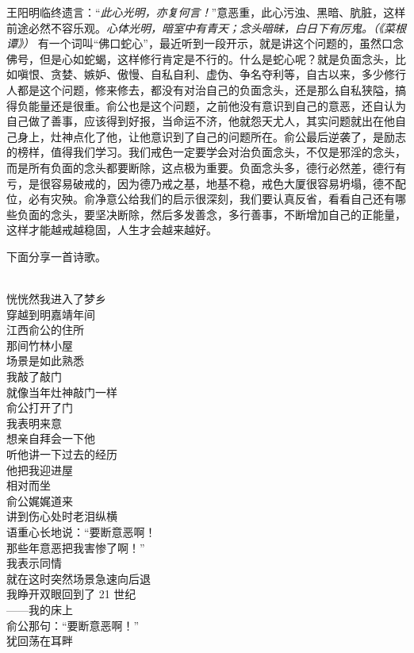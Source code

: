 王阳明临终遗言：“\textit{此心光明，亦复何言！}”意恶重，此心污浊、黑暗、肮脏，这样前途必然不容乐观。\textit{心体光明，暗室中有青天；念头暗昧，白日下有厉鬼。（《菜根谭》）} 有一个词叫“佛口蛇心”，最近听到一段开示，就是讲这个问题的，虽然口念佛号，但是心如蛇蝎，这样修行肯定是不行的。什么是蛇心呢？就是负面念头，比如嗔恨、贪婪、嫉妒、傲慢、自私自利、虚伪、争名夺利等，自古以来，多少修行人都是这个问题，修来修去，都没有对治自己的负面念头，还是那么自私狭隘，搞得负能量还是很重。俞公也是这个问题，之前他没有意识到自己的意恶，还自认为自己做了善事，应该得到好报，当命运不济，他就怨天尤人，其实问题就出在他自己身上，灶神点化了他，让他意识到了自己的问题所在。俞公最后逆袭了，是励志的榜样，值得我们学习。我们戒色一定要学会对治负面念头，不仅是邪淫的念头，而是所有负面的念头都要断除，这点极为重要。负面念头多，德行必然差，德行有亏，是很容易破戒的，因为德乃戒之基，地基不稳，戒色大厦很容易坍塌，德不配位，必有灾殃。俞净意公给我们的启示很深刻，我们要认真反省，看看自己还有哪些负面的念头，要坚决断除，然后多发善念，多行善事，不断增加自己的正能量，这样才能越戒越稳固，人生才会越来越好。

下面分享一首诗歌。

\begin{poem}[梦遇俞公记]
    \begin{multicols}{3}
        \centering~\\
        恍恍然我进入了梦乡 \\ 穿越到明嘉靖年间 \\ 江西俞公的住所 \\ 那间竹林小屋 \\ 场景是如此熟悉 \\ 我敲了敲门 \\ 就像当年灶神敲门一样 \\ 俞公打开了门 \\ 我表明来意 \\ 想亲自拜会一下他 \\ 听他讲一下过去的经历 \\ 他把我迎进屋 \\ 相对而坐 \\ 俞公娓娓道来 \\ 讲到伤心处时老泪纵横 \\ 语重心长地说：“要断意恶啊！ \\ 那些年意恶把我害惨了啊！” \\ 我表示同情 \\ 就在这时突然场景急速向后退 \\ 我睁开双眼回到了 21 世纪 \\ ——我的床上 \\ 俞公那句：“要断意恶啊！” \\ 犹回荡在耳畔
    \end{multicols}
\end{poem}

